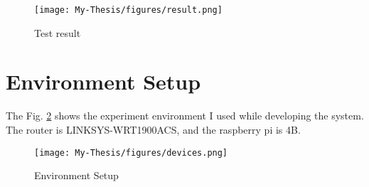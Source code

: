 \begin{figure}[h]
    \centering
    \texttt{[image: My-Thesis/figures/result.png]}    
    \caption{Test result}
    \label{fig:result}
\end{figure}

\section{Environment Setup}

The Fig. \ref{fig:environment} shows the experiment environment I used while developing the system. The router is LINKSYS-WRT1900ACS, and the raspberry pi is 4B.

\begin{figure}[h]
    \centering
    \texttt{[image: My-Thesis/figures/devices.png]}    
    \caption{Environment Setup}
    \label{fig:environment}
\end{figure}
